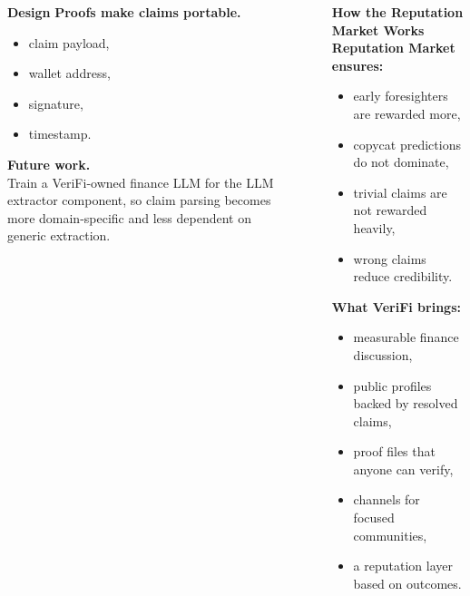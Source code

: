 \documentclass[final]{beamer}
\newlength{\sepwidth}
\newlength{\colwidth}
\newcommand{\separatorcolumn}{\begin{column}{\sepwidth}\end{column}}
\newcommand{\blocktitleformat}[1]{%
  {\fontsize{42}{48}\selectfont\bfseries #1}%
}
\newcommand{\subtitleformat}[1]{%
  {\fontsize{36pt}{43pt}\selectfont\color{blue!60!black}\textbf{#1}}%
}
\begin{document}
\begin{frame}[t]
\begin{columns}[t]
\begin{column}{\colwidth}
\begin{block}{\blocktitleformat{Design}}
    \vspace{0.8cm}
    \subtitleformat{Proofs make claims portable.}
    \begin{itemize}
      \item claim payload,
      \item wallet address,
      \item signature,
      \item timestamp.
    \end{itemize}

    \vspace{0.7cm}
    \subtitleformat{Future work.}\\
    Train a VeriFi-owned finance LLM for the LLM extractor component, so claim parsing becomes more domain-specific and less dependent on generic extraction.
  \end{block}

\end{column}

\separatorcolumn

\begin{column}{\colwidth}

  \begin{block}{\blocktitleformat{How the Reputation Market Works}}
    \textbf{Reputation Market ensures:}
    \begin{itemize}
      \item early foresighters are rewarded more,
      \item copycat predictions do not dominate,
      \item trivial claims are not rewarded heavily,
      \item wrong claims reduce credibility.
    \end{itemize}

    \vspace{0.7cm}
    \textbf{What VeriFi brings:}
    \begin{itemize}
      \item measurable finance discussion,
      \item public profiles backed by resolved claims,
      \item proof files that anyone can verify,
      \item channels for focused communities,
      \item a reputation layer based on outcomes.
    \end{itemize}
  \end{block}


\end{column}
\end{columns}
\end{frame}
\end{document}
